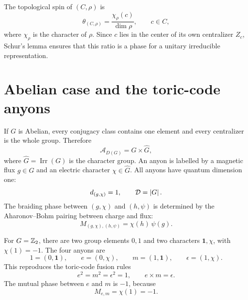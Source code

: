 The topological spin of \((C,\rho)\) is
\begin{equation}
\label{eq:quantum-double-topological-spin}
    \theta_{(C,\rho)}
    =
    \frac{\chi_{\rho}(c)}{\dim\rho},
    \qquad c\in C,
\end{equation}
where \(\chi_{\rho}\) is the character of \(\rho\).  Since \(c\) lies in the
center of its own centralizer \(Z_c\), Schur's lemma ensures that this ratio is a
phase for a unitary irreducible representation.

\section{Abelian case and the toric-code anyons}
\label{sec:abelian-quantum-double-anyons}

If \(G\) is Abelian, every conjugacy class contains one element and every
centralizer is the whole group.  Therefore
\begin{equation}
\label{eq:abelian-anyon-labels}
    \mathcal{A}_{D(G)}
    =
    G\times \widehat{G},
\end{equation}
where \(\widehat{G}=\operatorname{Irr}(G)\) is the character group.  An anyon is
labelled by a magnetic flux \(g\in G\) and an electric character
\(\chi\in\widehat{G}\).  All anyons have quantum dimension one:
\begin{equation}
\label{eq:abelian-quantum-double-dimensions}
    d_{(g,\chi)}=1,
    \qquad
    \mathcal{D}=\left|G\right| .
\end{equation}
The braiding phase between \((g,\chi)\) and \((h,\psi)\) is determined by the
Aharonov--Bohm pairing between charge and flux:
\begin{equation}
\label{eq:abelian-double-mutual-braiding}
    M_{(g,\chi),(h,\psi)}
    =
    \chi(h)\,\psi(g) .
\end{equation}

For \(G=\mathbb{Z}_2\), there are two group elements \(0,1\) and two characters
\(\mathbf{1},\chi\), with \(\chi(1)=-1\).  The four anyons are
\begin{equation}
\label{eq:toric-code-anyon-labels-from-dz2}
    1=(0,\mathbf{1}),
    \qquad
    e=(0,\chi),
    \qquad
    m=(1,\mathbf{1}),
    \qquad
    \epsilon=(1,\chi).
\end{equation}
This reproduces the toric-code fusion rules
\begin{equation}
\label{eq:toric-code-fusion-from-dz2}
    e^2=m^2=\epsilon^2=1,
    \qquad
    e\times m=\epsilon .
\end{equation}
The mutual phase between \(e\) and \(m\) is \(-1\), because
\begin{equation}
\label{eq:toric-code-mutual-phase-from-character}
    M_{e,m}=\chi(1)=-1 .
\end{equation}

